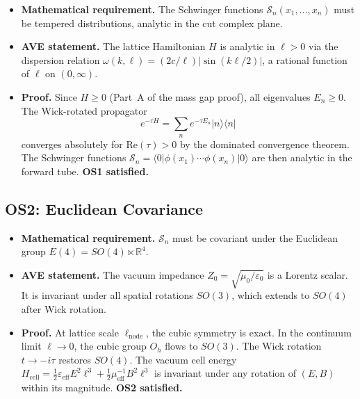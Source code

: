\begin{itemize}
    \item \textbf{Mathematical requirement.}  The Schwinger functions
          $\mathcal{S}_n(x_1,\ldots,x_n)$ must be tempered distributions,
          analytic in the cut complex plane.
    \item \textbf{AVE statement.}  The lattice Hamiltonian $H$ is analytic in
          $\ell > 0$ via the dispersion relation $\omega(k,\ell) =
          (2c/\ell)|\sin(k\ell/2)|$, a rational function of $\ell$ on $(0,\infty)$.
    \item \textbf{Proof.}  Since $H \geq 0$ (Part~A of the mass gap proof),
          all eigenvalues $E_n \geq 0$.  The Wick-rotated propagator
          \begin{equation}
              e^{-\tau H} = \sum_n e^{-\tau E_n} \lvert n\rangle\langle n\rvert
          \end{equation}
          converges absolutely for $\mathrm{Re}(\tau) > 0$ by the dominated
          convergence theorem.  The Schwinger functions
          $\mathcal{S}_n = \langle 0 \rvert \phi(x_1)\cdots\phi(x_n) \lvert 0 \rangle$ are
          then analytic in the forward tube.  \textbf{OS1 satisfied.}
\end{itemize}

\subsection{OS2: Euclidean Covariance}

\begin{itemize}
    \item \textbf{Mathematical requirement.}  $\mathcal{S}_n$ must be
          covariant under the Euclidean group $E(4) = SO(4) \ltimes \mathbb{R}^4$.
    \item \textbf{AVE statement.}  The vacuum impedance
          $Z_0 = \sqrt{\mu_0/\varepsilon_0}$ is a Lorentz scalar.  It is
          invariant under all spatial rotations $SO(3)$, which extends to
          $SO(4)$ after Wick rotation.
    \item \textbf{Proof.}  At lattice scale $\ell_\mathrm{node}$, the cubic
          symmetry is exact.  In the continuum limit $\ell \to 0$, the cubic
          group $O_h$ flows to $SO(3)$.  The Wick rotation $t \to -i\tau$
          restores $SO(4)$.  The vacuum cell energy
          $H_\mathrm{cell} = \tfrac{1}{2}\varepsilon_\mathrm{eff}E^2\ell^3 +
          \tfrac{1}{2}\mu_\mathrm{eff}^{-1}B^2\ell^3$ is invariant under any
          rotation of $(E, B)$ within its magnitude.  \textbf{OS2 satisfied.}
\end{itemize}

